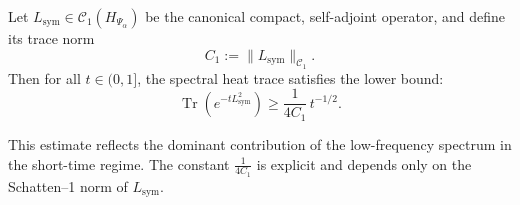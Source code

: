 \begin{lemma}
\label{lem:hk_lower_bound}
Let \( L_{\mathrm{sym}} \in \mathcal{C}_1(H_{\Psi_\alpha}) \) be the canonical compact, self-adjoint operator, and define its trace norm
\[
C_1 := \| L_{\mathrm{sym}} \|_{\mathcal{C}_1}.
\]
Then for all \( t \in (0,1] \), the spectral heat trace satisfies the lower bound:
\[
\operatorname{Tr}\left( e^{-t L_{\mathrm{sym}}^2} \right) \ge \frac{1}{4C_1} \, t^{-1/2}.
\]

\medskip
\noindent
This estimate reflects the dominant contribution of the low-frequency spectrum in the short-time regime. The constant \( \frac{1}{4C_1} \) is explicit and depends only on the Schatten–1 norm of \( L_{\mathrm{sym}} \).
\end{lemma}
